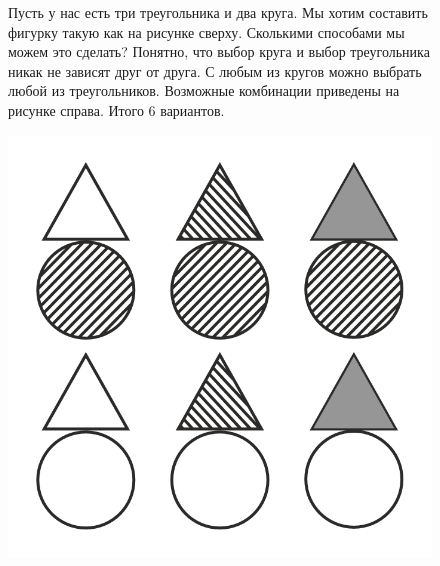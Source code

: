 \begin{figure}[h!]
\begin{minipage}{0.84\linewidth}\setlength{\parindent}{1.5em}
Пусть у нас есть три треугольника и два круга. Мы хотим составить фигурку такую как на рисунке сверху. Сколькими способами мы можем это сделать? Понятно, что выбор круга и выбор треугольника никак не зависят друг от друга. С любым из кругов можно выбрать любой из треугольников. Возможные комбинации приведены на рисунке справа. Итого 6 вариантов. 
\end{minipage}
\begin{minipage}{0.15\linewidth}
    \includegraphics[width=0.9\columnwidth]{./img/tre}
\end{minipage}
\end{figure}

